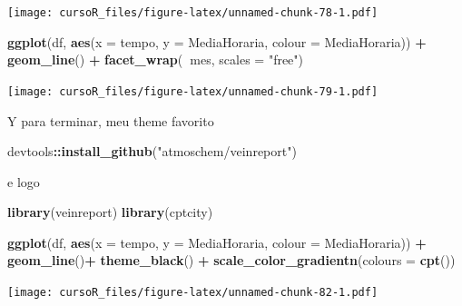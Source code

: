 \documentclass[]{book}
\newenvironment{Shaded}{\begin{snugshade}}{\end{snugshade}}
\newcommand{\KeywordTok}[1]{\textcolor[rgb]{0.13,0.29,0.53}{\textbf{#1}}}
\newcommand{\DataTypeTok}[1]{\textcolor[rgb]{0.13,0.29,0.53}{#1}}
\newcommand{\StringTok}[1]{\textcolor[rgb]{0.31,0.60,0.02}{#1}}
\newcommand{\OperatorTok}[1]{\textcolor[rgb]{0.81,0.36,0.00}{\textbf{#1}}}
\newcommand{\NormalTok}[1]{#1}
\begin{document}
\texttt{[image: cursoR\_files/figure-latex/unnamed-chunk-78-1.pdf]}

\begin{Shaded}
\begin{Highlighting}[]
\KeywordTok{ggplot}\NormalTok{(df, }\KeywordTok{aes}\NormalTok{(}\DataTypeTok{x =}\NormalTok{ tempo, }\DataTypeTok{y =}\NormalTok{ MediaHoraria, }\DataTypeTok{colour =}\NormalTok{ MediaHoraria)) }\OperatorTok{+}\StringTok{ }
\StringTok{  }\KeywordTok{geom_line}\NormalTok{() }\OperatorTok{+}
\StringTok{  }\KeywordTok{facet_wrap}\NormalTok{(}\OperatorTok{~}\NormalTok{mes, }\DataTypeTok{scales =} \StringTok{"free"}\NormalTok{)}
\end{Highlighting}
\end{Shaded}

\texttt{[image: cursoR\_files/figure-latex/unnamed-chunk-79-1.pdf]}

Y para terminar, meu theme favorito

\begin{Shaded}
\begin{Highlighting}[]
\NormalTok{devtools}\OperatorTok{::}\KeywordTok{install_github}\NormalTok{(}\StringTok{"atmoschem/veinreport"}\NormalTok{)}
\end{Highlighting}
\end{Shaded}

e logo

\begin{Shaded}
\begin{Highlighting}[]
\KeywordTok{library}\NormalTok{(veinreport)}
\KeywordTok{library}\NormalTok{(cptcity)}
\end{Highlighting}
\end{Shaded}

\begin{Shaded}
\begin{Highlighting}[]
\KeywordTok{ggplot}\NormalTok{(df, }\KeywordTok{aes}\NormalTok{(}\DataTypeTok{x =}\NormalTok{ tempo, }\DataTypeTok{y =}\NormalTok{ MediaHoraria, }\DataTypeTok{colour =}\NormalTok{ MediaHoraria)) }\OperatorTok{+}\StringTok{ }
\StringTok{  }\KeywordTok{geom_line}\NormalTok{()}\OperatorTok{+}
\StringTok{  }\KeywordTok{theme_black}\NormalTok{() }\OperatorTok{+}
\StringTok{  }\KeywordTok{scale_color_gradientn}\NormalTok{(}\DataTypeTok{colours =} \KeywordTok{cpt}\NormalTok{())}
\end{Highlighting}
\end{Shaded}

\texttt{[image: cursoR\_files/figure-latex/unnamed-chunk-82-1.pdf]}
\end{document}
